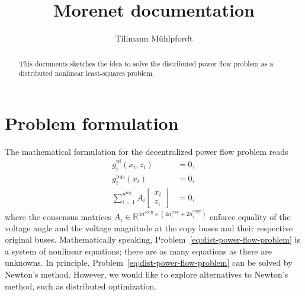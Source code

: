\documentclass{article}
\title{Morenet documentation}
\author{Tillmann Mühlpfordt}
\newcommand{\n}{n}
\newcommand{\nregions}{\n^{\text{reg}}}
\newcommand{\nconnections}{\n^{\text{conn}}}
\newcommand{\ncore}{\n^\text{core}}
\newcommand{\ncopy}{\n^\text{copy}}
\newcommand{\stateCore}{x}
\newcommand{\stateCopy}{z}
\newcommand{\pf}{g^{\text{pf}}}
\newcommand{\busspecs}{g^{\text{bus}}}
\begin{document}
\maketitle

\begin{abstract}
This documents sketches the idea to solve the distributed power flow problem as a distributed nonlinear least-squares problem.
\end{abstract}

\section{Problem formulation}
The mathematical formulation for the decentralized power flow problem reads
\begin{subequations}
    \label{eq:dist-power-flow-problem}
    \begin{align}
        \pf_i( \stateCore_i, \stateCopy_i ) &= 0, \\
        \busspecs_i ( \stateCore_i ) &= 0, \\
        \sum_{i = 1}^{\nregions} A_i \begin{bmatrix}
            \stateCore_i \\
            \stateCopy_i
        \end{bmatrix}
        &= 0,
    \end{align}
\end{subequations}
where the consensus matrices $A_i \in \mathbb{R}^{4 \nconnections \times (4 \ncore_i + 2 \ncopy_i)}$ enforce equality of the voltage angle and the voltage magnitude at the copy buses and their respective original buses.
Mathematically speaking, Problem~\ref{eq:dist-power-flow-problem} is a system of nonlinear equations; there are as many equations as there are unknowns.
In principle, Problem~\ref{eq:dist-power-flow-problem} can be solved by Newton's method.
However, we would like to explore alternatives to Newton's method, such as distributed optimization.
\end{document}
